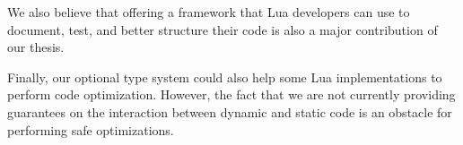 \documentclass[preprint]{sig-alternate}
\begin{document}
We also believe that offering a framework that Lua developers can
use to document, test, and better structure their code is also a
major contribution of our thesis.

Finally, our optional type system could also help some Lua
implementations to perform code optimization.
However, the fact that we are not currently providing guarantees on
the interaction between dynamic and static code is an obstacle for
performing safe optimizations.



\end{document}
